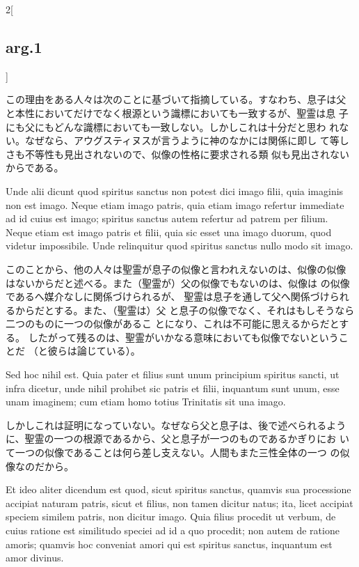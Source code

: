 \documentclass[paper=a4paper,fontsize=10pt,jafontsize=9pt,titlepage]{jlreq}
\begin{document}
\begin{paracol}{2}[\subsection{arg.1}]
\switchcolumn

この理由をある人々は次のことに基づいて指摘している。すなわち、息子は父
 と本性においてだけでなく根源という識標においても一致するが、聖霊は息
 子にも父にもどんな識標においても一致しない。しかしこれは十分だと思わ
 れない。なぜなら、アウグスティヌスが言うように神のなかには関係に即し
 て等しさも不等性も見出されないので、似像の性格に要求される類
 似も見出されないからである。

\switchcolumn*

Unde alii dicunt quod spiritus
sanctus non potest dici imago filii, quia imaginis non est
imago. Neque etiam imago patris, quia etiam imago refertur immediate
ad id cuius est imago; spiritus sanctus autem refertur ad patrem per
filium. Neque etiam est imago patris et filii, quia sic esset una
imago duorum, quod videtur impossibile. Unde relinquitur quod spiritus
sanctus nullo modo sit imago.

\switchcolumn

このことから、他の人々は聖霊が息子の似像と言われえないのは、似像の似像
 はないからだと述べる。また（聖霊が）父の似像でもないのは、似像は
 の似像であるへ媒介なしに関係づけられるが、
 聖霊は息子を通して父へ関係づけられるからだとする。また、（聖霊は）父
 と息子の似像でなく、それはもしそうなら二つのものに一つの似像があるこ
 とになり、これは不可能に思えるからだとする。
したがって残るのは、聖霊がいかなる意味においても似像でないということだ
 （と彼らは論じている）。

\switchcolumn*

Sed hoc nihil est. Quia pater et filius
sunt unum principium spiritus sancti, ut infra dicetur, unde nihil
prohibet sic patris et filii, inquantum sunt unum, esse unam imaginem;
cum etiam homo totius Trinitatis sit una imago.

\switchcolumn

しかしこれは証明になっていない。なぜなら父と息子は、後で述べられるよう
 に、聖霊の一つの根源であるから、父と息子が一つのものであるかぎりにお
 いて一つの似像であることは何ら差し支えない。人間もまた三性全体の一つ
 の似像なのだから。

\switchcolumn*

Et ideo aliter
dicendum est quod, sicut spiritus sanctus, quamvis sua processione
accipiat naturam patris, sicut et filius, non tamen dicitur natus;
ita, licet accipiat speciem similem patris, non dicitur imago. Quia
filius procedit ut verbum, de cuius ratione est similitudo speciei ad
id a quo procedit; non autem de ratione amoris; quamvis hoc conveniat
amori qui est spiritus sanctus, inquantum est amor divinus.


\end{paracol}
\end{document}
